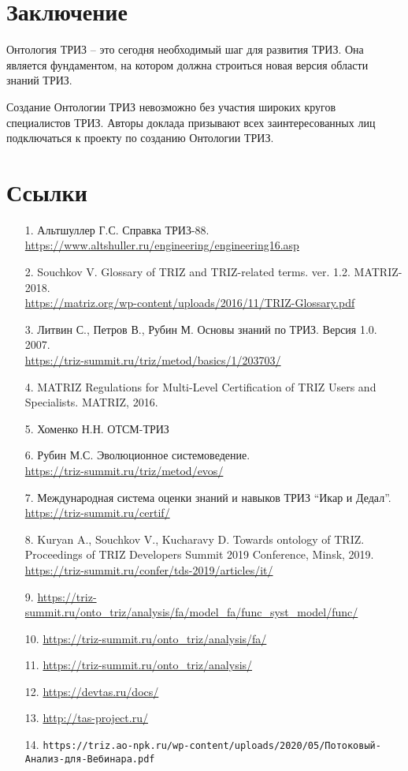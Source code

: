 \documentclass[11pt,a4paper]{article}
\begin{document}
\section{Заключение}

Онтология ТРИЗ -- это сегодня необходимый шаг для развития ТРИЗ. Она является
фундаментом, на котором должна строиться новая версия области знаний ТРИЗ.

Создание Онтологии ТРИЗ невозможно без участия широких кругов специалистов
ТРИЗ. Авторы доклада призывают всех заинтересованных лиц подключаться к
проекту по созданию Онтологии ТРИЗ.

\section{Ссылки}
\begin{itemize}[leftmargin=18pt]
\item[1.] Альтшуллер Г.С. Справка ТРИЗ-88.\\
  \url{https://www.altshuller.ru/engineering/engineering16.asp}
\item[2.] Souchkov V. Glossary of TRIZ and TRIZ-related terms.  ver. 1.2.
  MATRIZ-2018.\\
  \url{https://matriz.org/wp-content/uploads/2016/11/TRIZ-Glossary.pdf}
\item[3.] Литвин С., Петров В., Рубин М. Основы знаний по ТРИЗ. Версия
  1.0. 2007.\\ \url{https://triz-summit.ru/triz/metod/basics/1/203703/}
\item[4.] MATRIZ Regulations for Multi-Level Certification of TRIZ Users and
  Specialists.  MATRIZ, 2016.
\item[5.] Хоменко Н.Н. ОТСМ-ТРИЗ
\item[6.] Рубин М.С. Эволюционное системоведение.\\
  \url{https://triz-summit.ru/triz/metod/evos/}
\item[7.] Международная система оценки знаний и навыков ТРИЗ “Икар и
  Дедал”.\\ \url{https://triz-summit.ru/certif/}
\item[8.] Kuryan A., Souchkov V., Kucharavy D. Towards ontology of TRIZ.
  Proceedings of TRIZ Developers Summit 2019 Conference, Minsk, 2019.\\
  \url{https://triz-summit.ru/confer/tds-2019/articles/it/}
\item[9.]
  \url{https://triz-summit.ru/onto_triz/analysis/fa/model_fa/func_syst_model/func/} 
\item[10.] \url{https://triz-summit.ru/onto_triz/analysis/fa/}
\item[11.] \url{https://triz-summit.ru/onto_triz/analysis/}
\item[12.] \url{https://devtas.ru/docs/}
\item[13.] \url{http://tas-project.ru/}
\item[14.] \texttt{https://triz.ao-npk.ru/wp-content/uploads/2020/05/Потоковый-Анализ-для-Вебинара.pdf}
\end{itemize}
\end{document}
